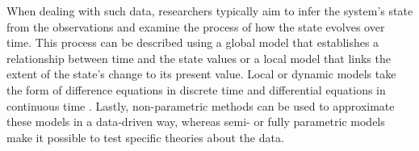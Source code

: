 When dealing with such data, researchers typically aim to infer the 
system's state from the observations and examine the process of how 
the state evolves over time. This process can be described using a global 
model that establishes a relationship between time and the state values or 
a local model that links the extent of the state's change to its present value. 
Local or dynamic models take the form of difference equations in discrete time 
\parencite{durbin_time_2012, galor_discrete_2007}
and differential equations in continuous time \parencite{van_montfort_continuous_2018}. 
Lastly, non-parametric methods can be used to approximate these models in a data-driven way,
whereas semi- or fully parametric models make it possible to test specific theories about the data.
